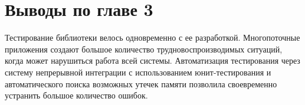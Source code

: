 \section*{Выводы по главе 3}

Тестирование библиотеки велось одновременно с ее разработкой. Многопоточные приложения создают большое количество трудновоспроизводимых ситуаций, когда может нарушиться работа всей системы. Автоматизация тестирования через систему непрерывной интеграции с использованием юнит-тестирования и автоматического поиска возможных утечек памяти позволила своевременно устранить большое количество ошибок.

